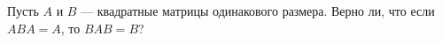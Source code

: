 \documentclass{article}
\begin{document}
Пусть $A$ и $B$ --- квадратные матрицы одинакового размера. Верно ли, что если $ABA=A$, то $BAB=B$?
\end{document}

